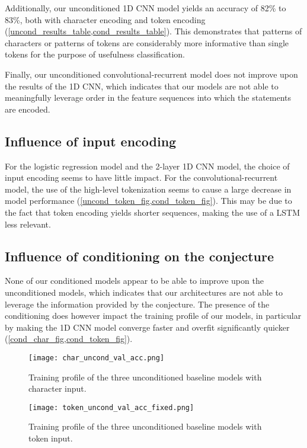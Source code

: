 \documentclass[]{article}
\begin{document}
Additionally, our unconditioned 1D CNN model yields an accuracy of 82\%
to 83\%, both with character encoding and token encoding (\cref{uncond_results_table,cond_results_table}).
This demonstrates that patterns of characters or patterns of tokens are
considerably more informative than single tokens for the purpose of
usefulness classification.

Finally, our unconditioned convolutional-recurrent model does not
improve upon the results of the 1D CNN, which indicates that our models
are not able to meaningfully leverage order in the feature sequences
into which the statements are encoded.

\subsection{Influence of input encoding}

For the logistic regression model and the 2-layer 1D CNN model, the
choice of input encoding seems to have little impact. For the
convolutional-recurrent model, the use of the high-level tokenization
seems to cause a large decrease in model performance (\cref{uncond_token_fig,cond_token_fig}).
This may be due to the fact that token encoding yields shorter sequences, making the use of
a LSTM less relevant.

\subsection{Influence of conditioning on the conjecture}

None of our conditioned models appear to be able to improve upon the
unconditioned models, which indicates that our architectures are not
able to leverage the information provided by the conjecture. The
presence of the conditioning does however impact the training profile of
our models, in particular by making the 1D CNN model converge faster and
overfit significantly quicker (\cref{cond_char_fig,cond_token_fig}).

\begin{figure}[!ht]
\centering
  \parbox{.48\textwidth}{
    \hspace{.05\textwidth}\texttt{[image: char\_uncond\_val\_acc.png]}
    \caption{Training profile of the three unconditioned baseline models with character input.}
    \label{uncond_char_fig}
  }\hspace{0.03\textwidth}
  \begin{minipage}{.48\textwidth}
    \hspace{.05\textwidth}\texttt{[image: token\_uncond\_val\_acc\_fixed.png]}
    \caption{Training profile of the three unconditioned baseline models with token input.}
    \label{uncond_token_fig}
  \end{minipage}
\end{figure}
\end{document}
